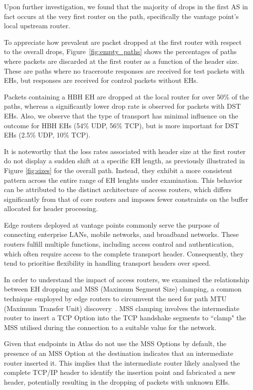 \documentclass[conference]{IEEEtran}
\begin{document}
Upon further investigation, we found that the majority of drops in the first AS
in fact occurs at the very first router on the path, specifically the vantage
point's local upstream router.

To appreciate how prevalent are packet dropped at the first router with respect
to the overall drops, Figure~\ref{fig:empty_paths} shows the percentages of
paths where packets are discarded at the first router as a function of the
header size.  These are paths where no traceroute responses are received for
test packets with EHs, but responses are received for control packets without
EHs.

Packets containing a HBH EH are dropped at the local router for over 50\% of
the paths, whereas a significantly lower drop rate is observed for packets with
DST EHs.  Also, we observe that the type of transport has minimal influence on
the outcome for HBH EHs (54\% UDP, 56\% TCP), but is more important for DST EHs
(2.5\% UDP, 10\% TCP).

It is noteworthy that the loss rates associated with header size at the first
router do not display a sudden shift at a specific EH length, as previously
illustrated in Figure \ref{fig:sizes} for the overall path. Instead, they
exhibit a more consistent pattern across the entire range of EH lenghts under
examination.  This behavior can be attributed to the distinct architecture of
access routers, which differs significantly from that of core routers and
imposes fewer constraints on the buffer allocated for header processing.

Edge routers deployed at vantage points commonly serve the purpose of
connecting enterprise LANs, mobile networks, and broadband networks. These
routers fulfill multiple functions, including access control and
authentication, which often require access to the complete transport header.
Consequently, they tend to prioritise flexibility in handling transport headers
over speed.

In order to understand the impact of access routers, we examined the
relationship between EH dropping and MSS (Maximum Segment Size) clamping, a
common technique employed by edge routers to circumvent the need for path MTU
(Maximum Transfer Unit) discovery~\cite{custura-mtu}.  MSS clamping involves
the intermediate router to insert a TCP Option into the TCP handshake segments
to ``clamp" the MSS utilised during the connection to a suitable value for the
network.

Given that endpoints in Atlas do not use the MSS Options by default, the
presence of an MSS Option at the destination indicates that an intermediate
router inserted it. This implies that the intermediate router likely analysed
the complete TCP/IP header to identify the insertion point and fabricated a new
header, potentially resulting in the dropping of packets with unknown EHs.
\end{document}
